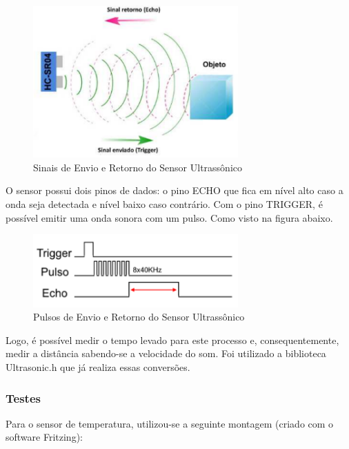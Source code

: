 \begin{figure}[H]
\centering
\includegraphics[width=0.7\textwidth]{figuras/sensor_ultrasom}
 \caption{Sinais de Envio e Retorno do Sensor Ultrassônico}
\label{fig:sensor_ultrasom}
\end{figure}

O sensor possui dois pinos de dados: o pino ECHO que fica em nível alto caso a onda seja detectada e nível baixo caso contrário. Com o pino TRIGGER, é possível emitir uma onda sonora com um pulso. Como visto na figura abaixo.

\begin{figure}[H]
\centering
\includegraphics[width=0.7\textwidth]{figuras/trigger}
 \caption{Pulsos de Envio e Retorno do Sensor Ultrassônico}
\label{fig:trigger}
\end{figure}

Logo, é possível medir o tempo levado para este processo e, consequentemente, medir a distância sabendo-se a velocidade do som. Foi utilizado a biblioteca Ultrasonic.h que já realiza essas conversões.

\newpage

\subsubsection{Testes}

Para o sensor de temperatura, utilizou-se a seguinte montagem (criado com o software Fritzing):

